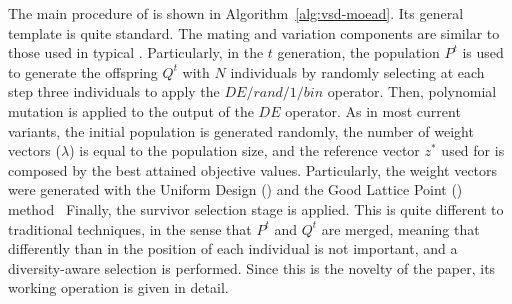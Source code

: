 The main procedure of \AVSDMOEAD{} is shown in Algorithm~\ref{alg:vsd-moead}.
%
Its general template is quite standard.
%
The mating and variation components are similar to those used in typical \MOEAS{}.
%
Particularly, in the $t$ generation, the population $P^t$ is used to generate
the offspring $Q^t$ with $N$ individuals by randomly selecting at each step three individuals
to apply the $DE/rand/1/bin$ operator.
%
Then, polynomial mutation is applied to the output of the $DE$ operator.
%
As in most current \MOEAD{} variants, the initial population is generated randomly,
the number of weight vectors ($\lambda$) is equal to the population size,
and the reference vector $z^*$ used for \ASF{} is composed by the best attained 
objective values.
%
Particularly, the weight vectors were generated
with the Uniform Design (\UD{}) and the Good Lattice Point (\GLP{}) method~\cite{tan2013moea1, tan2013moea2}
%
Finally, the survivor selection stage is applied.
%
This is quite different to traditional techniques, in the sense that $P^t$ and $Q^t$ are merged, meaning
that differently than in \MOEAD{} the position of each individual is not important, and a diversity-aware
selection is performed.
%
Since this is the novelty of the paper, its working operation is given in detail.

